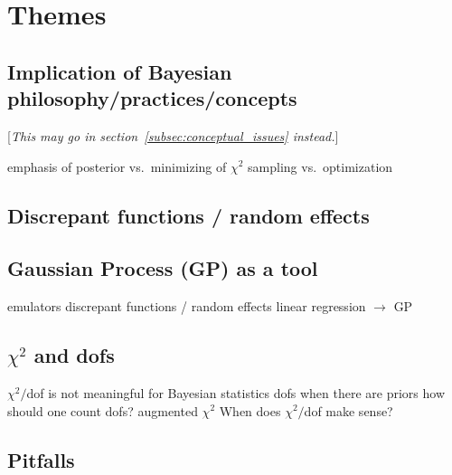 \section{Themes}  \label{sec:themes}


\subsection{Implication of Bayesian philosophy/practices/concepts}  \label{subsec:implications}

[\emph{This may go in section~\ref{subsec:conceptual_issues} instead.}]

\bi
  \I emphasis of posterior vs.\ minimizing of $\chi^2$
  \I sampling vs.\ optimization  
\ei

\subsection{Discrepant functions / random effects}  \label{subsec:discrepant}


\subsection{Gaussian Process (GP) as a tool}  \label{subsec:GP_tool}

\bi
  \I emulators
  \I discrepant functions / random effects 
  \I linear regression $\rightarrow$ GP
\ei


\subsection{$\chi^2$ and dofs}  \label{subsec:}

   \bi 
       \I $\chi^2/$dof is not meaningful for Bayesian statistics
       \I dofs when there are priors
       \I how should one count dofs?
       \I augmented $\chi^2$
       \I When does $\chi^2/$dof make sense?
   \ei    

\subsection{Pitfalls}  \label{subsec:pitfalls}

